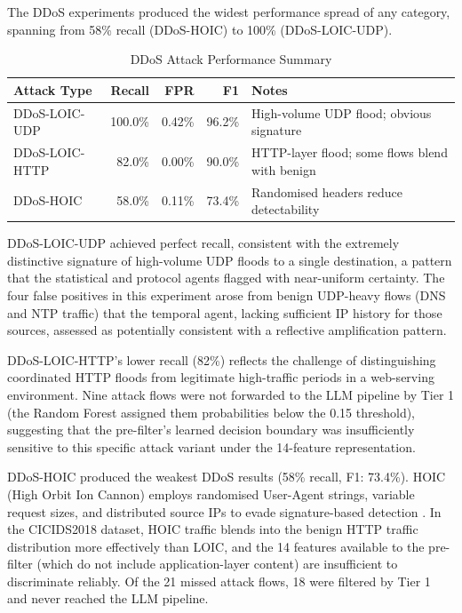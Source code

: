 The DDoS experiments produced the widest performance spread of any category, spanning from 58\% recall (DDoS-HOIC) to 100\% (DDoS-LOIC-UDP).

\begin{table}[H]
\centering
\caption{DDoS Attack Performance Summary}
\label{tab:ddos-performance}
\begin{tabularx}{\textwidth}{l r r r X}
\toprule
Attack Type & Recall & FPR & F1 & Notes \\
\midrule
DDoS-LOIC-UDP & 100.0\% & 0.42\% & 96.2\% & High-volume UDP flood; obvious signature \\
DDoS-LOIC-HTTP & 82.0\% & 0.00\% & 90.0\% & HTTP-layer flood; some flows blend with benign \\
DDoS-HOIC & 58.0\% & 0.11\% & 73.4\% & Randomised headers reduce detectability \\
\bottomrule
\end{tabularx}
\end{table}

DDoS-LOIC-UDP achieved perfect recall, consistent with the extremely distinctive signature of high-volume UDP floods to a single destination, a pattern that the statistical and protocol agents flagged with near-uniform certainty. The four false positives in this experiment arose from benign UDP-heavy flows (DNS and NTP traffic) that the temporal agent, lacking sufficient IP history for those sources, assessed as potentially consistent with a reflective amplification pattern.

DDoS-LOIC-HTTP's lower recall (82\%) reflects the challenge of distinguishing coordinated HTTP floods from legitimate high-traffic periods in a web-serving environment. Nine attack flows were not forwarded to the LLM pipeline by Tier 1 (the Random Forest assigned them probabilities below the 0.15 threshold), suggesting that the pre-filter's learned decision boundary was insufficiently sensitive to this specific attack variant under the 14-feature representation.

DDoS-HOIC produced the weakest DDoS results (58\% recall, F1: 73.4\%). HOIC (High Orbit Ion Cannon) employs randomised User-Agent strings, variable request sizes, and distributed source IPs to evade signature-based detection \autocite{Razak2017}. In the CICIDS2018 dataset, HOIC traffic blends into the benign HTTP traffic distribution more effectively than LOIC, and the 14 features available to the pre-filter (which do not include application-layer content) are insufficient to discriminate reliably. Of the 21 missed attack flows, 18 were filtered by Tier 1 and never reached the LLM pipeline.

